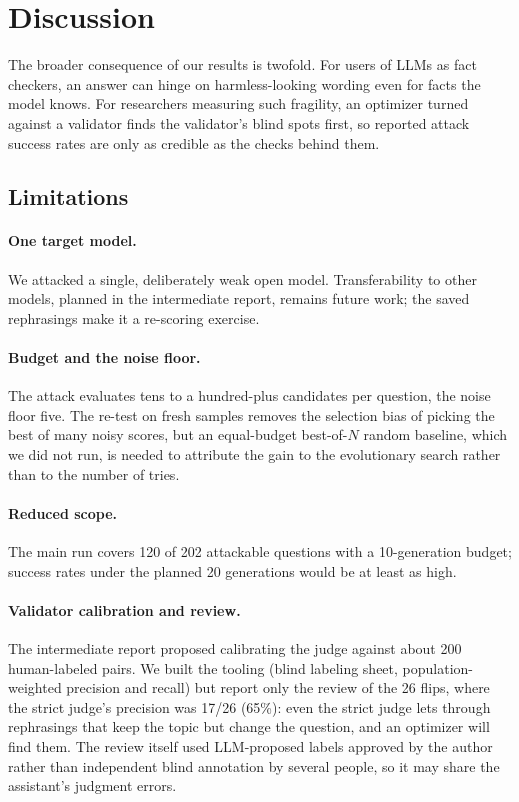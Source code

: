 \documentclass[sigconf,nonacm]{acmart}
\begin{document}
\section{Discussion}
The broader consequence of our results is twofold. For users of LLMs as fact checkers, an answer can hinge on harmless-looking wording even for facts the model knows. For researchers measuring such fragility, an optimizer turned against a validator finds the validator's blind spots first, so reported attack success rates are only as credible as the checks behind them.

\subsection{Limitations}\label{sec:limits}
\paragraph{One target model.} We attacked a single, deliberately weak open model. Transferability to other models, planned in the intermediate report, remains future work; the saved rephrasings make it a re-scoring exercise.

\paragraph{Budget and the noise floor.} The attack evaluates tens to a hundred-plus candidates per question, the noise floor five. The re-test on fresh samples removes the selection bias of picking the best of many noisy scores, but an equal-budget best-of-$N$ random baseline, which we did not run, is needed to attribute the gain to the evolutionary search rather than to the number of tries.

\paragraph{Reduced scope.} The main run covers 120 of 202 attackable questions with a 10-generation budget; success rates under the planned 20 generations would be at least as high.

\paragraph{Validator calibration and review.} The intermediate report proposed calibrating the judge against about 200 human-labeled pairs. We built the tooling (blind labeling sheet, population-weighted precision and recall) but report only the review of the 26 flips, where the strict judge's precision was 17/26 (65\%): even the strict judge lets through rephrasings that keep the topic but change the question, and an optimizer will find them. The review itself used LLM-proposed labels approved by the author rather than independent blind annotation by several people, so it may share the assistant's judgment errors.
\end{document}
